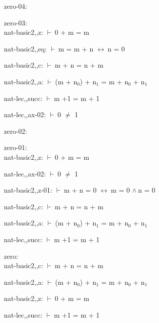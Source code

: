 \documentclass[a4paper]{article}
\newcommand{\Fol}{\mbox{$\vdash\ $}}
\newcommand{\And}{\mbox{$\wedge\ $}}
\newcommand{\Equiv}{\mbox{$\leftrightarrow\ $}}
\begin{document}
\raggedright
              
zero-04:\\ 

\bigskip

zero-03:\\ nat-basic2,,z: 
 \Fol 0 + m = m



nat-basic2,,eq: 
 \Fol m = m + n \Equiv n = 0



nat-basic2,,c: 
 \Fol m + n = n + m



nat-basic2,,a: 
 \Fol (m + $\mbox{n}_{0}$) + $\mbox{n}_{1}$ = m + $\mbox{n}_{0}$ + $\mbox{n}_{1}$



nat-lec,,succ: 
 \Fol m +1 = m + 1



nat-lec,,ax-02: 
 \Fol 0 $\neq$ 1



\bigskip

zero-02:\\ 

\bigskip

zero-01:\\ nat-basic2,,z: 
 \Fol 0 + m = m



nat-lec,,ax-02: 
 \Fol 0 $\neq$ 1



nat-basic2,,z-01: 
 \Fol m + n = 0 \Equiv m = 0 \And n = 0



nat-basic2,,c: 
 \Fol m + n = n + m



nat-basic2,,a: 
 \Fol (m + $\mbox{n}_{0}$) + $\mbox{n}_{1}$ = m + $\mbox{n}_{0}$ + $\mbox{n}_{1}$



nat-lec,,succ: 
 \Fol m +1 = m + 1



\bigskip

zero:\\ nat-basic2,,c: 
 \Fol m + n = n + m



nat-basic2,,a: 
 \Fol (m + $\mbox{n}_{0}$) + $\mbox{n}_{1}$ = m + $\mbox{n}_{0}$ + $\mbox{n}_{1}$



nat-basic2,,z: 
 \Fol 0 + m = m



nat-lec,,succ: 
 \Fol m +1 = m + 1
\end{document}
